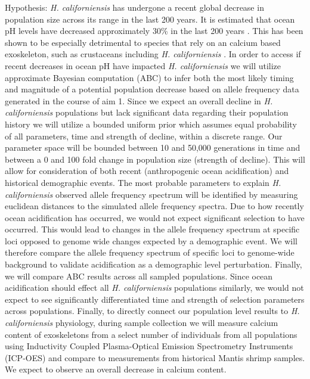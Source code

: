\documentclass[11pt]{article}
\begin{document}
Hypothesis: \emph{H. californiensis} has undergone a recent global decrease in population size across its range in the last 200 years. It is estimated that ocean pH levels have decreased approximately 30\% in the last 200 years \cite{noauthor_ocean_nodate}. This has been shown to be especially detrimental to species that rely on an calcium based exoskeleton, such as crustaceans including \emph{H. californiensis} \cite{Taylor2015}. In order to access if recent decreases in ocean pH have impacted \emph{H. californiensis} we will utilize approximate Bayesian computation (ABC) to infer both the most likely timing and magnitude of a potential population decrease based on allele frequency data generated in the course of aim 1. Since we expect an overall decline in \emph{H. californiensis} populations but lack significant data regarding their population history we will utilize a bounded uniform prior which assumes equal probability of all parameters, time and strength of decline, within a discrete range. Our parameter space will be bounded between 10 and 50,000 generations in time and between a 0 and 100 fold change in population size (strength of decline). This will allow for consideration of both recent (anthropogenic ocean acidification) and historical demographic events. The most probable parameters to explain \emph{H. californiensis} observed allele frequency spectrum will be identified by measuring euclidean distances to the simulated allele frequency spectra. Due to how recently ocean acidification has occurred, we would not expect significant selection to have occurred. This would lead to changes in the allele frequency spectrum at specific loci opposed to genome wide changes expected by a demographic event. We will therefore compare the allele frequency spectrum of specific loci to genome-wide background to validate acidification as a demographic level perturbation. Finally, we will compare ABC results across all sampled populations. Since ocean acidification should effect all \emph{H. californiensis} populations similarly, we would not expect to see significantly differentiated time and strength of selection parameters across populations. Finally, to directly connect our population level results to \emph{H. californiensis} physiology, during sample collection we will measure calcium content of exoskeletons from a select number of individuals from all populations using Inductivity Coupled Plasma-Optical Emission Spectrometry Instruments (ICP-OES) and compare to measurements from historical Mantis shrimp samples. We expect to observe an overall decrease in calcium content.  

\pagebreak


\end{document}
